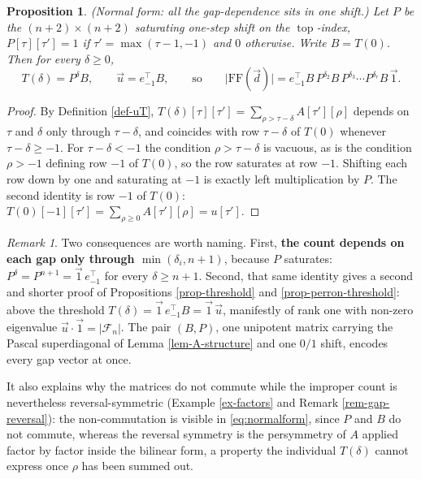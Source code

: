 \documentclass[11pt, a4paper, abstract=yes]{scrartcl}
\theoremstyle{definition}
\theoremstyle{remark}
\newtheorem{remark}[definition]{Remark}
\theoremstyle{plain}
\newtheorem{proposition}[definition]{Proposition}
\newcommand{\tp}{\operatorname{top}}
\begin{document}
\begin{proposition}
(\emph{Normal form: all the gap-dependence sits in one shift.}) Let \(P\) be the
\((n+2)\times(n+2)\) saturating one-step shift on the \(\tp\)-index,
\(P[\tau][\tau']=1\) if \(\tau'=\max(\tau-1,-1)\) and \(0\) otherwise. Write \(B=T(0)\). Then for
every \(\delta\ge0\),
\begin{equation}\label{eq:normalform}
  T(\delta)=P^{\delta}B,
  \qquad
  \vec u=e_{-1}^{\!\top}B,
  \qquad\text{so}\qquad
  \lvert\mathrm{FF}(\vec d)\rvert
   =e_{-1}^{\!\top}B\,P^{\delta_2}B\,P^{\delta_3}\cdots P^{\delta_r}B\,\vec 1 .
\end{equation}
\label{prop-normalform}
\end{proposition}

\begin{proof}
By Definition \ref{def-uT}, \(T(\delta)[\tau][\tau']=\sum_{\rho>\tau-\delta}A[\tau'][\rho]\) depends on
\(\tau\) and \(\delta\) only through \(\tau-\delta\), and coincides with row \(\tau-\delta\) of
\(T(0)\) whenever \(\tau-\delta\ge-1\). For \(\tau-\delta<-1\) the condition \(\rho>\tau-\delta\) is
vacuous, as is the condition \(\rho>-1\) defining row \(-1\) of \(T(0)\), so the row saturates at row
\(-1\). Shifting each row down by one and saturating at \(-1\) is exactly left multiplication by
\(P\). The second identity is row \(-1\) of \(T(0)\): \(T(0)[-1][\tau']=\sum_{\rho\ge0}A[\tau'][\rho]
=u[\tau']\).
\end{proof}

\begin{remark}
Two consequences are worth naming. First, \textbf{the count depends on each gap only through
\(\min(\delta_i,n+1)\)}, because \(P\) saturates: \(P^{\delta}=P^{n+1}=\vec1\,e_{-1}^{\!\top}\) for
every \(\delta\ge n+1\). Second, that same identity gives a second and shorter proof of
Propositions \ref{prop-threshold} and \ref{prop-perron-threshold}: above the threshold
\(T(\delta)=\vec1\,e_{-1}^{\!\top}B=\vec1\,\vec u\), manifestly of rank one with non-zero eigenvalue
\(\vec u\cdot\vec1=\lvert\mathcal F_n\rvert\). The pair \((B,P)\), one unipotent
matrix carrying the Pascal superdiagonal of Lemma \ref{lem-A-structure} and one \(0/1\) shift, encodes
every gap vector at once.

It also explains why the matrices do not commute while the improper count is nevertheless
reversal-symmetric
(Example \ref{ex-factors} and Remark \ref{rem-gap-reversal}): the non-commutation is visible in
\eqref{eq:normalform}, since \(P\) and \(B\) do not commute, whereas the reversal symmetry is the
persymmetry of \(A\) applied factor by factor inside the bilinear form, a property the individual
\(T(\delta)\) cannot express once \(\rho\) has been summed out.
\label{rem-normalform}
\end{remark}
\end{document}
